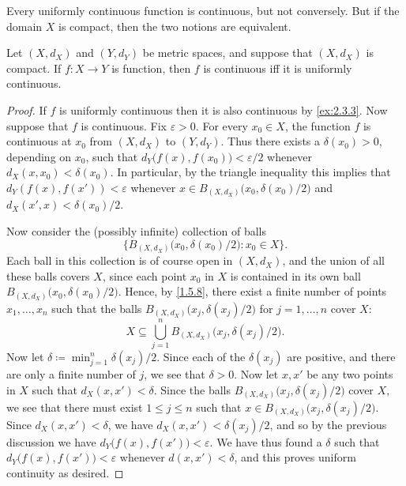 \begin{note}
  Every uniformly continuous function is continuous, but not conversely.
  But if the domain \(X\) is compact, then the two notions are equivalent.
\end{note}

\begin{thm}\label{2.3.5}
  Let \((X, d_X)\) and \((Y, d_Y)\) be metric spaces, and suppose that \((X, d_X)\) is compact.
  If \(f : X \to Y\) is function, then \(f\) is continuous iff it is uniformly continuous.
\end{thm}

\begin{proof}
  If \(f\) is uniformly continuous then it is also continuous by \cref{ex:2.3.3}.
  Now suppose that \(f\) is continuous.
  Fix \(\varepsilon > 0\).
  For every \(x_0 \in X\), the function \(f\) is continuous at \(x_0\) from \((X, d_X)\) to \((Y, d_Y)\).
  Thus there exists a \(\delta(x_0) > 0\), depending on \(x_0\), such that \(d_Y\big(f(x), f(x_0)\big) < \varepsilon / 2\) whenever \(d_X(x, x_0) < \delta(x_0)\).
  In particular, by the triangle inequality this implies that \(d_Y(f(x), f(x')) < \varepsilon\) whenever \(x \in B_{(X, d_X)}\big(x_0, \delta(x_0) / 2\big)\) and \(d_X(x', x) < \delta(x_0) / 2\).

  Now consider the (possibly infinite) collection of balls
  \[
    \Big\{B_{(X, d_X)}\big(x_0, \delta(x_0) / 2\big) : x_0 \in X\Big\}.
  \]
  Each ball in this collection is of course open in \((X, d_X)\), and the union of all these balls covers \(X\), since each point \(x_0\) in \(X\) is contained in its own ball \(B_{(X, d_X)}\big(x_0, \delta(x_0) / 2\big)\).
  Hence, by \cref{1.5.8}, there exist a finite number of points \(x_1, \dots, x_n\) such that the balls \(B_{(X, d_X)}\big(x_j, \delta(x_j) / 2\big)\) for \(j = 1, \dots, n\) cover \(X\):
  \[
    X \subseteq \bigcup_{j = 1}^n B_{(X, d_X)}\big(x_j, \delta(x_j) / 2\big).
  \]
  Now let \(\delta \coloneqq \min_{j = 1}^n \delta(x_j) / 2\).
  Since each of the \(\delta(x_j)\) are positive, and there are only a finite number of \(j\), we see that \(\delta > 0\).
  Now let \(x, x'\) be any two points in \(X\) such that \(d_X(x, x') < \delta\).
  Since the balls \(B_{(X, d_X)}\big(x_j, \delta(x_j) / 2\big)\) cover \(X\), we see that there must exist \(1 \leq j \leq n\) such that \(x \in B_{(X, d_X)}\big(x_j, \delta(x_j) / 2\big)\).
  Since \(d_X(x, x') < \delta\), we have \(d_X(x, x') < \delta(x_j) / 2\), and so by the previous discussion we have \(d_Y\big(f(x), f(x')\big) < \varepsilon\).
  We have thus found a \(\delta\) such that \(d_Y\big(f(x), f(x')\big) < \varepsilon\) whenever \(d(x, x') < \delta\), and this proves uniform continuity as desired.
\end{proof}


